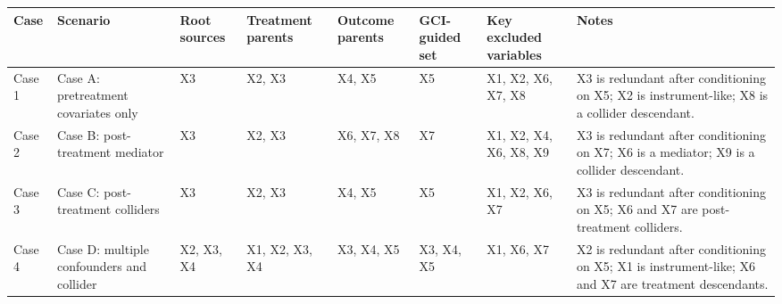 \begin{tabular}{llllllll}
\toprule
Case & Scenario & Root sources & Treatment parents & Outcome parents & GCI-guided set & Key excluded variables & Notes \\
\midrule
Case 1 & Case A: pretreatment covariates only & X3 & X2, X3 & X4, X5 & X5 & X1, X2, X6, X7, X8 & X3 is redundant after conditioning on X5; X2 is instrument-like; X8 is a collider descendant. \\
Case 2 & Case B: post-treatment mediator & X3 & X2, X3 & X6, X7, X8 & X7 & X1, X2, X4, X6, X8, X9 & X3 is redundant after conditioning on X7; X6 is a mediator; X9 is a collider descendant. \\
Case 3 & Case C: post-treatment colliders & X3 & X2, X3 & X4, X5 & X5 & X1, X2, X6, X7 & X3 is redundant after conditioning on X5; X6 and X7 are post-treatment colliders. \\
Case 4 & Case D: multiple confounders and collider & X2, X3, X4 & X1, X2, X3, X4 & X3, X4, X5 & X3, X4, X5 & X1, X6, X7 & X2 is redundant after conditioning on X5; X1 is instrument-like; X6 and X7 are treatment descendants. \\
\bottomrule
\end{tabular}
